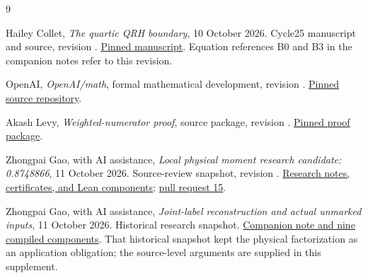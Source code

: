 \begin{thebibliography}{9}
\raggedright
{}
Hailey Collet, \emph{The quartic QRH boundary}, 10 October 2026.
Cycle25 manuscript and source, revision
.
\href{https://github.com/HaileyStorm/QuasiRiemannTracker/blob/58344dfdbe756cf2f743da1908ffe0582418cf5b/public/proofs/cycle25-quartic-20261010/paper.tex}{Pinned manuscript}.
Equation references B0 and B3 in the companion notes refer to this revision.

OpenAI, \emph{OpenAI/math}, formal mathematical development,
revision .
\href{https://github.com/openai/math/tree/fd4aeeb2ee4fc729c18d98444fed42fd0529eeeb}{Pinned source repository}.

Akash Levy, \emph{Weighted-numerator proof}, source package,
revision .
\href{https://github.com/akashlevy/QuasiRiemannTracker/tree/2fd60c0926b66ea18d7436f5ed55250fd006ab5d/proofs/akashlevy-20261009-weighted-numerator}{Pinned proof package}.

Zhongpai Gao, with AI assistance,
\emph{Local physical moment research candidate: 0.8748866},
11 October 2026. Source-review snapshot,
revision .
\href{https://github.com/Gaozhongpai/QuasiRiemannTracker/tree/7f9166e2d626586cc3c89853497c0e0e22e856ee/proofs/gao-local-moment-20261011}{Research notes, certificates, and Lean components};
\href{https://github.com/GTimG/QuasiRiemannTracker/pull/15}{pull request 15}.

Zhongpai Gao, with AI assistance,
\emph{Joint-label reconstruction and actual unmarked inputs},
11 October 2026. Historical research snapshot.
\href{https://github.com/Gaozhongpai/QuasiRiemannTracker/tree/gao-local-moment-source-review-20261011/proofs/gao-local-moment-20261011-v2}{Companion note and nine compiled components}.
That historical snapshot kept the physical factorization as an
application obligation; the source-level arguments are supplied
in this supplement.
\end{thebibliography}
